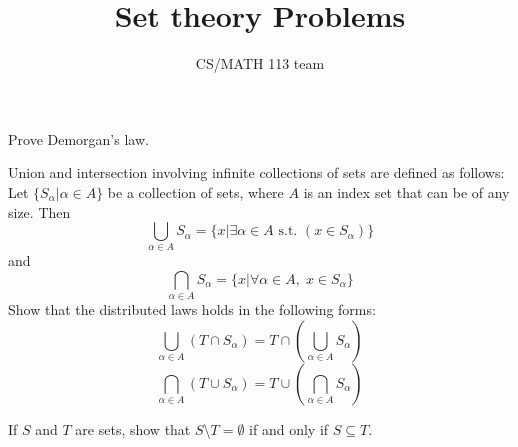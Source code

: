\documentclass{exam}
\title{Set theory Problems}
\author{CS/MATH 113 team}
\begin{document}
\maketitle

\begin{questions}
    \question Prove Demorgan's law.
    \begin{solution}
        
    \end{solution}

    \question Union and intersection involving infinite collections of sets are defined as follows:
    \\Let $\{S_\alpha|\alpha \in A\}$ be a collection of sets, where $A$ is an index set that can be of any size. Then 
    $$\bigcup_{\alpha \in A}S_\alpha = \{x| \exists \alpha \in A \text{ s.t. } (x \in S_\alpha)\}$$
    and
    $$\bigcap_{\alpha \in A}S_\alpha = \{x|\forall \alpha \in A,\; x \in S_\alpha\}$$
    Show that the distributed laws holds in the following forms:
    $$\bigcup_{\alpha \in A}(T \cap S_\alpha) = T \cap \left(\bigcup_{\alpha \in A}S_\alpha  \right)$$
    $$\bigcap_{\alpha \in A}(T \cup S_\alpha) = T \cup \left(\bigcap_{\alpha \in A}S_\alpha  \right)$$
    \begin{solution}
        
    \end{solution}

    \question If $S$ and $T$ are sets, show that $S$\textbackslash$T = \emptyset$ if and only if $S \subseteq T$.
    \begin{solution}
        
    \end{solution}


    
    
    
\end{questions}
\end{document}
